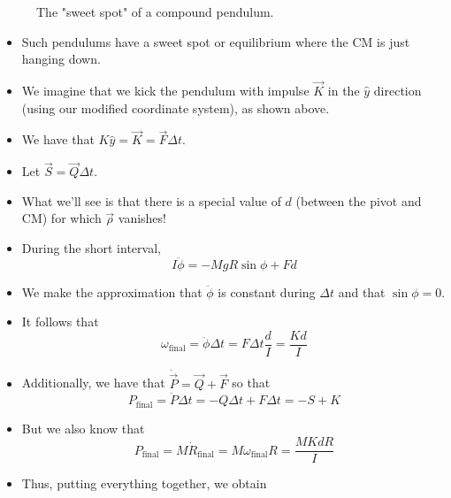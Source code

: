 \documentclass[../notes.tex]{subfiles}
\begin{document}
\begin{itemize}
\begin{figure}[h!]
        \caption{The "sweet spot" of a compound pendulum.}
        \label{fig:compoundPendulum2}
    \end{figure}
    \begin{itemize}
        \item Such pendulums have a sweet spot or equilibrium where the CM is just hanging down.
        \item We imagine that we kick the pendulum with impulse $\vec{K}$ in the $\hat{y}$ direction (using our modified coordinate system), as shown above.
        \item We have that $K\hat{y}=\vec{K}=\vec{F}\Delta t$.
        \item Let $\vec{S}=\vec{Q}\Delta t$.
        \item What we'll see is that there is a special value of $d$ (between the pivot and CM) for which $\vec{\rho}$ vanishes!
        \item During the short interval,
        \begin{equation*}
            I\ddot{\phi} = -MgR\sin\phi+Fd
        \end{equation*}
        \item We make the approximation that $\ddot{\phi}$ is constant during $\Delta t$ and that $\sin\phi=0$.
        \item It follows that
        \begin{equation*}
            \omega_\text{final} = \ddot{\phi}\Delta t
            = F\Delta t\frac{d}{I}
            = \frac{Kd}{I}
        \end{equation*}
        \item Additionally, we have that $\dot{\vec{P}}=\vec{Q}+\vec{F}$ so that
        \begin{equation*}
            P_\text{final} = \dot{P}\Delta t
            = -Q\Delta t+F\Delta t
            = -S+K
        \end{equation*}
        \item But we also know that
        \begin{equation*}
            P_\text{final} = M\dot{R}_\text{final}
            = M\omega_\text{final}R
            = \frac{MKdR}{I}
        \end{equation*}
        \item Thus, putting everything together, we obtain

\end{itemize}
\end{itemize}
\end{document}
